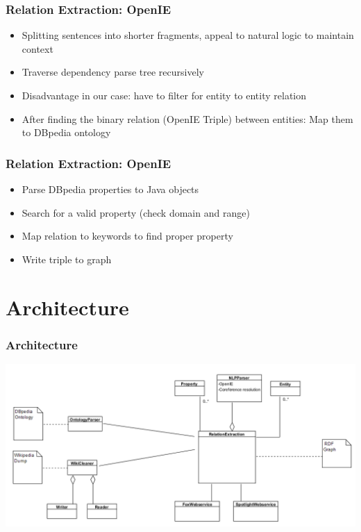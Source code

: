 \documentclass{beamer}
\begin{document}

\begin{frame}
\frametitle{Relation Extraction: OpenIE }
\begin{itemize}
	\item Splitting sentences into shorter fragments, appeal to natural logic to maintain context
	\item Traverse dependency parse tree recursively \cite{p1}
	\item Disadvantage in our case: have to filter for entity to entity relation 
	\item After finding the binary relation (OpenIE Triple) between entities: Map them to DBpedia ontology
\end{itemize}
\end{frame}


\begin{frame}
\frametitle{Relation Extraction: OpenIE }
\begin{itemize}
	\item Parse DBpedia properties to Java objects
	\item Search for a valid property (check domain and range)
	\item Map relation to keywords to find proper property 
	\item Write triple to graph
\end{itemize}
\end{frame}


\section{Architecture}

\begin{frame}
\frametitle{Architecture}
\begin{center}
	\includegraphics[scale=0.43]{architecture.PNG}
\end{center}
\end{frame}
\end{document}

